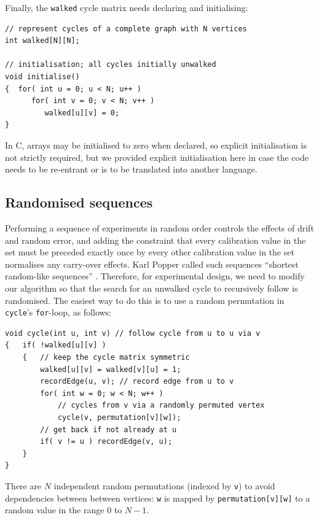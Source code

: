\documentclass[preprint,times]{elsarticle}
\begin{document}
Finally, the \texttt{walked} cycle matrix needs declaring and initialising: 

\begin{Verbatim}
// represent cycles of a complete graph with N vertices
int walked[N][N]; 

// initialisation; all cycles initially unwalked
void initialise() 
{  for( int u = 0; u < N; u++ )
      for( int v = 0; v < N; v++ )
         walked[u][v] = 0; 
}
\end{Verbatim}

In C, arrays may be initialised to zero when declared, so explicit initialisation is not strictly required, but we provided explicit initialisation here in case the code needs to be re-entrant or is to be translated into another language. 

\subsection{Randomised sequences}\label{randomise}

Performing a sequence of experiments in random order controls the effects of drift and random error, and adding the constraint that every calibration value in the set must be preceded exactly once by every other calibration value in the set normalises any carry-over effects. Karl Popper called such sequences ``shortest random-like sequences'' \cite{popper}. Therefore, for experimental design, we need to modify our algorithm so that the search for an unwalked cycle to recursively follow is randomised. The easiest way to do this is to use a random permutation in \texttt{cycle}'s \texttt{for}-loop, as follows:

\begin{Verbatim}
void cycle(int u, int v) // follow cycle from u to u via v
{   if( !walked[u][v] )
    {   // keep the cycle matrix symmetric
        walked[u][v] = walked[v][u] = 1; 
        recordEdge(u, v); // record edge from u to v
        for( int w = 0; w < N; w++ ) 
            // cycles from v via a randomly permuted vertex
            cycle(v, permutation[v][w]); 
        // get back if not already at u
        if( v != u ) recordEdge(v, u); 
    }
}
\end{Verbatim}

There are $N$ independent random permutations (indexed by \texttt{v}) to avoid dependencies between between vertices: \texttt{w} is mapped by \texttt{permutation[v][w]} to a random value in the range $0$ to $N-1$.
\end{document}
